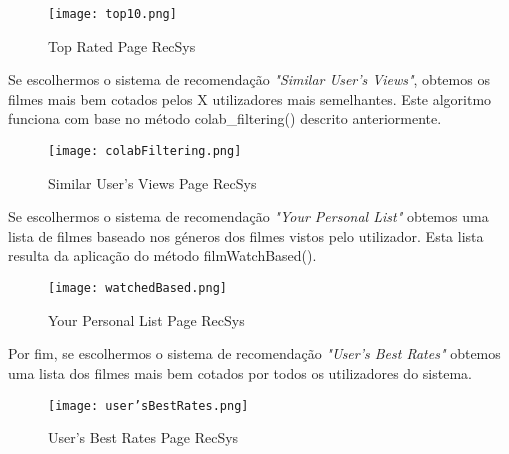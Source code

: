 \begin{figure}[H]
\centering
\texttt{[image: top10.png]}
\caption {Top Rated Page RecSys}
\label {fig14}
\end{figure}

Se escolhermos o sistema de recomendação \textit{"Similar User's Views"}, obtemos os filmes mais bem cotados pelos X utilizadores mais semelhantes. Este algoritmo funciona com base no método colab\_filtering() descrito anteriormente.\newline

\begin{figure}[H]
\centering
\texttt{[image: colabFiltering.png]}
\caption {Similar User's Views Page RecSys}
\label {fig15}
\end{figure}

Se escolhermos o sistema de recomendação \textit{"Your Personal List"} obtemos uma lista de filmes baseado nos géneros dos filmes vistos pelo utilizador. Esta lista resulta da aplicação do método filmWatchBased().\newline

\begin{figure}[H]
\centering
\texttt{[image: watchedBased.png]}
\caption {Your Personal List Page RecSys}
\label {fig16}
\end{figure}

Por fim, se escolhermos o sistema de recomendação \textit{"User's Best Rates"} obtemos uma lista dos filmes mais bem cotados por todos os utilizadores do sistema.\newline

\begin{figure}[H]
\centering
\texttt{[image: user'sBestRates.png]}
\caption {User's Best Rates Page RecSys}
\label {fig17}
\end{figure}

\newpage
